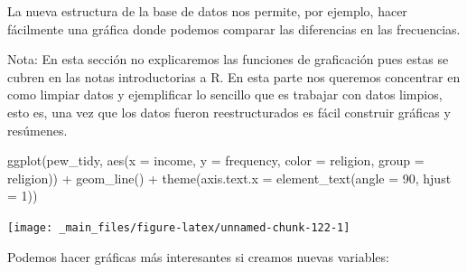 \documentclass[
]{book}
\newenvironment{Shaded}{\begin{snugshade}}{\end{snugshade}}
\newcommand{\AttributeTok}[1]{\textcolor[rgb]{0.77,0.63,0.00}{#1}}
\newcommand{\DecValTok}[1]{\textcolor[rgb]{0.00,0.00,0.81}{#1}}
\newcommand{\FunctionTok}[1]{\textcolor[rgb]{0.00,0.00,0.00}{#1}}
\newcommand{\NormalTok}[1]{#1}
\newcommand{\SpecialCharTok}[1]{\textcolor[rgb]{0.00,0.00,0.00}{#1}}
\begin{document}
La nueva estructura de la base de datos nos permite, por ejemplo, hacer
fácilmente una gráfica donde podemos comparar las diferencias en las
frecuencias.

Nota: En esta sección no explicaremos las funciones de graficación pues estas
se cubren en las notas introductorias a R. En esta parte nos queremos concentrar
en como limpiar datos y ejemplificar lo sencillo que es trabajar con datos
limpios, esto es, una vez que los datos fueron reestructurados es fácil
construir gráficas y resúmenes.

\begin{Shaded}
\begin{Highlighting}[]
\FunctionTok{ggplot}\NormalTok{(pew\_tidy, }\FunctionTok{aes}\NormalTok{(}\AttributeTok{x =}\NormalTok{ income, }\AttributeTok{y =}\NormalTok{ frequency, }\AttributeTok{color =}\NormalTok{ religion, }\AttributeTok{group =}\NormalTok{ religion)) }\SpecialCharTok{+}
  \FunctionTok{geom\_line}\NormalTok{() }\SpecialCharTok{+} 
  \FunctionTok{theme}\NormalTok{(}\AttributeTok{axis.text.x =} \FunctionTok{element\_text}\NormalTok{(}\AttributeTok{angle =} \DecValTok{90}\NormalTok{, }\AttributeTok{hjust =} \DecValTok{1}\NormalTok{))}
\end{Highlighting}
\end{Shaded}

\begin{center}\texttt{[image: \_main\_files/figure-latex/unnamed-chunk-122-1]} \end{center}

Podemos hacer gráficas más interesantes si creamos nuevas variables:
\end{document}
